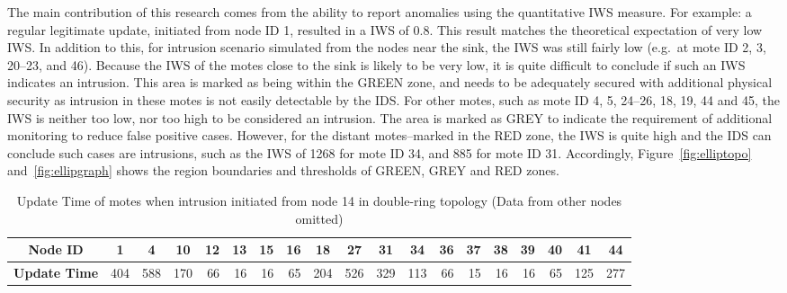 \documentclass{CRPITStyle}
\newcommand*{\bd}[1]{\multicolumn{1}{|c|}{\bfseries #1}}
\begin{document}
The main contribution of this research comes from the ability to report anomalies using the quantitative IWS measure.
For example:  a regular legitimate update, initiated from node ID 1, resulted in a IWS of 0.8.
This result matches the theoretical expectation of very low IWS.
In addition to this, for intrusion scenario simulated from the nodes near the sink, the IWS was still fairly low (e.g.\ at mote ID 2, 3, 20--23, and 46). 
Because the IWS of the motes close to the sink is likely to be very low, it is quite difficult to conclude if such an IWS indicates an intrusion.
This area is marked as being within the GREEN zone, and needs to be adequately secured with additional physical security as intrusion in these motes is not easily detectable by the IDS.
For other motes, such as mote ID 4, 5, 24--26, 18, 19, 44 and 45, the IWS is neither too low, nor too high to be considered an intrusion. The area is marked as GREY to indicate the requirement of additional monitoring to reduce false positive cases.
However, for the distant motes--marked in the RED zone, the IWS is quite high and the IDS can conclude such cases are intrusions, such as the IWS of 1268 for mote ID 34, and 885 for mote ID 31. %
Accordingly, Figure~\ref{fig:elliptopo} and~\ref{fig:ellipgraph} shows the region boundaries and thresholds of GREEN, GREY and RED zones.%

\begin{table}[t]
\centering
\begin{tabular}{|l|*{17}{r|}r|}
\hline
\bd{Node ID}           & \bd{1} & \bd{4} & \bd{10} & \bd{12} & \bd{13} & \bd{15} & \bd{16} & \bd{18} & \bd{27} & \bd{31} & \bd{34} & \bd{36} & \bd{37} & \bd{38} & \bd{39} & \bd{40} & \bd{41} & \bd{44}\\
\hline
\bd{Update Time}  &   404 	&  588 	& 170 	& 66 	& 16 &	 16 	& 65 &	 204 &	 526 & 329 &	 113 &	 66 &	 15 	& 16 	& 16 &	 65 &	125 & 277 \\
\hline
\end{tabular}
\caption{Update Time of motes when intrusion initiated from node 14 in double-ring topology (Data from other nodes omitted) }
\label{tab:dr_time_14}
\end{table}
\end{document}
